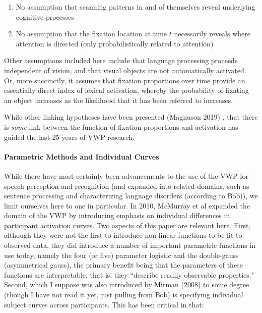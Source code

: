 \begin{enumerate}
\item No assumption that scanning patterns in and of themselves reveal underlying cognitive processes
\item No assumption that the fixation location at time $t$ necessarily reveals where attention is directed (only probabilistically related to attention)
\end{enumerate}


Other assumptions included here include that language processing proceeds independent of vision, and that visual objects are not automatically activated. Or, more succinctly, it assumes that fixation proportions over time provide an essentially direct index of lexical activation, whereby the probability of fixating an object increases as the likelihood that it has been referred to increases.


While other linking hypotheses have been presented (Magnuson 2019) \cite{Magnuson2019}, that there is \textit{some} link between the function of fixation proportions and activation has guided the last 25 years of VWP research.



\paragraph{Parametric Methods and Individual Curves} While there have most certainly been advancements to the use of the VWP for speech perception and recognition (and expanded into related domains, such as sentence processing and characterizing language disorders (according to Bob)), we  limit ourselves here to one in particular. In 2010, McMurray et al expanded the domain of the VWP by introducing emphasis on individual differences in participant activation curves. Two aspects of this paper are relevant here. First, although they were not the first to introduce non-linear functions to be fit to observed data, they did introduce a number of important parametric functions in use today, namely the four (or five) parameter logistic and the double-gauss (asymmetrical gauss), the primary benefit being that the parameters of these functions are interpretable, that is, they ``describe readily observable properties." Second, which I suppose was also introduced by Mirman (2008) \cite{Mirman2008} to some degree (though I have not read it yet, just pulling from Bob) is specifying individual subject curves across participants. This has been critical in that:


